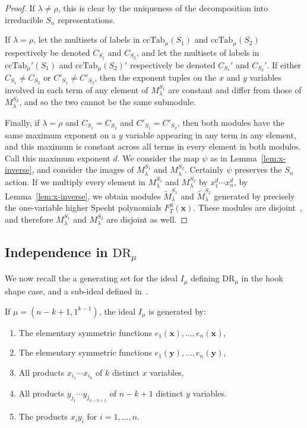 \documentclass[ALCO,Unicode]{cedram}
\newcommand{\ccind}{\mathrm{ccTab}}
\newcommand{\DR}{\mathrm{DR}}
\begin{document}
\begin{proof}
	If $\lambda\neq \rho$, this is clear by the uniqueness of the decomposition into irreducible $S_n$ representations.
	
	If $\lambda=\rho$, let the multisets of labels in $\ccind_\mu(S_1)$ and $\ccind_\mu(S_2)$ respectively be denoted $C_{S_1}$ and $C_{S_2}$, and let the multisets of labels in $\ccind_\mu'(S_1)$ and $\ccind_\mu(S_2)'$ respectively be denoted $C_{S_1}'$ and $C_{S_2}'$.  If either $C_{S_1} \neq C_{S_2}$ or $C'_{S_1} \neq C'_{S_2}$, then the exponent tuples on the $x$ and $y$ variables involved in each term of any element of $M_\lambda^{S_1}$ are constant and differ from those of $M_\lambda^{S_2}$, and so the two cannot be the same submodule.
	
	Finally, if $\lambda=\rho$ and $C_{S_1}=C_{S_2}$ and $C'_{S_1}=C'_{S_2}$, then both modules have the same maximum exponent on a $y$ variable appearing in any term in any element, and this maximum is constant across all terms in every element in both modules.  Call this maximum exponent $d$.  We consider the map $\psi$ as in Lemma~\ref{lem:x-inverse}, and consider the images of $M_\lambda^{S_1}$ and $M_{\lambda}^{S_2}$.  Certainly $\psi$ preserves the $S_n$ action. If we multiply every element in $M_\lambda^{S_1}$ and $M_{\lambda}^{S_2}$ by $x_1^d\cdots x_n^d$, by Lemma~\ref{lem:x-inverse}, we obtain modules $\widetilde{M}_{\lambda}^{S_1}$ and $\widetilde{M}_{\lambda}^{S_2}$ generated by precisely the one-variable higher Specht polynomials $F_T^S(\mathbf{x})$.  These modules are disjoint~\cite{ATY}, and therefore $M_\lambda^{S_1}$ and $M_\lambda^{S_2}$ are disjoint as well.
\end{proof}

\subsection{Independence in \texorpdfstring{$\DR_\mu$}{}}

We now recall the a generating set for the ideal $I_\mu$ defining $\DR_\mu$ in the hook shape case, and a sub-ideal defined in~\cite{HookBases}.

\begin{prop} \label{prop:ideal}
	If $\mu=(n-k+1,1^{k-1})$, the ideal $I_\mu$ is generated by:
	\begin{enumerate}
		\item The elementary symmetric functions $e_1(\mathbf{x}),\ldots,e_n(\mathbf{x})$,
		\item The elementary symmetric functions 
		$e_1(\mathbf{y}),\ldots,e_n(\mathbf{y})$,
		\item All products $x_{i_1}\cdots x_{i_k}$ of $k$ distinct $x$ variables,
		\item All products $y_{j_1}\cdots y_{j_{n-k+1}}$ of $n-k+1$ distinct $y$ variables.
		\item The products $x_iy_i$ for $i=1,\ldots,n$.
	\end{enumerate}
\end{prop}
\end{document}
